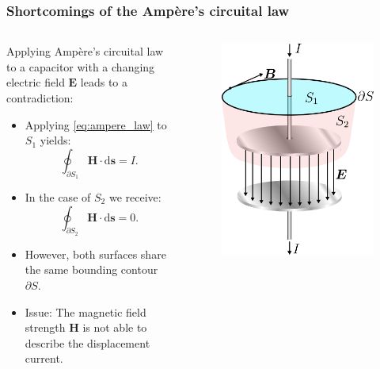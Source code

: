 \begin{frame}
	\frametitle{Shortcomings of the Amp\`ere's circuital law}
	\begin{columns}
		\begin{column}{0.55\textwidth}
			Applying Amp\`ere's circuital law to a capacitor with a changing electric field $\bm{E}$ leads to a contradiction:
            \begin{itemize}
                \item Applying \eqref{eq:ampere_law} to $S_1$ yields:
                $$\oint_{\partial S_1} \bm{H} \cdot \mathrm{d}\bm{s} = I.$$
                \item In the case of $S_2$ we receive:
                $$\oint_{\partial S_2} \bm{H} \cdot \mathrm{d}\bm{s} = 0.$$
                \item However, both surfaces share the same bounding contour $\partial S$.
                \item Issue: The magnetic field strength $\bm{H}$ is not able to describe the displacement current.
            \end{itemize}
		\end{column}
        \hfill
		\begin{column}{0.45\textwidth}
			\begin{figure}
				\centering
				\includegraphics[height=0.55\textheight]{fig/lec02/Displacement_current_in_capacitor.pdf}

\end{figure}
\end{column}
\end{columns}
\end{frame}
